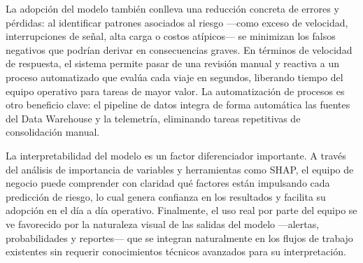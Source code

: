 \documentclass[12pt]{article}
\begin{document}
La adopción del modelo también conlleva una reducción concreta de errores y pérdidas: al identificar patrones asociados al riesgo —como exceso de velocidad, interrupciones de señal, alta carga o costos atípicos— se minimizan los falsos negativos que podrían derivar en consecuencias graves. En términos de velocidad de respuesta, el sistema permite pasar de una revisión manual y reactiva a un proceso automatizado que evalúa cada viaje en segundos, liberando tiempo del equipo operativo para tareas de mayor valor. La automatización de procesos es otro beneficio clave: el pipeline de datos integra de forma automática las fuentes del Data Warehouse y la telemetría, eliminando tareas repetitivas de consolidación manual.

La interpretabilidad del modelo es un factor diferenciador importante. A través del análisis de importancia de variables y herramientas como SHAP, el equipo de negocio puede comprender con claridad qué factores están impulsando cada predicción de riesgo, lo cual genera confianza en los resultados y facilita su adopción en el día a día operativo. Finalmente, el uso real por parte del equipo se ve favorecido por la naturaleza visual de las salidas del modelo —alertas, probabilidades y reportes— que se integran naturalmente en los flujos de trabajo existentes sin requerir conocimientos técnicos avanzados para su interpretación.
\end{document}

